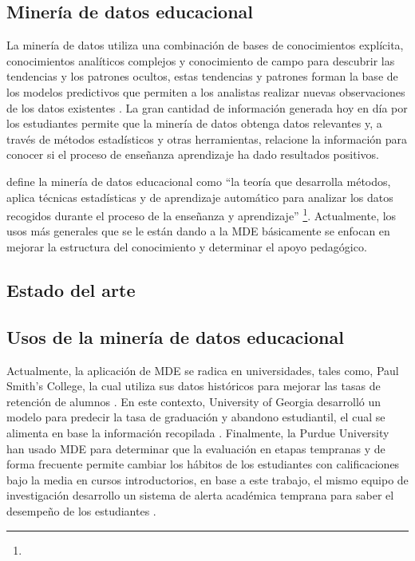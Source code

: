 \subsection*{Minería de datos educacional}
La minería de datos utiliza una combinación de bases de conocimientos explícita, conocimientos analíticos complejos y conocimiento de campo para descubrir las tendencias y los patrones ocultos, estas tendencias y patrones forman la base de los modelos predictivos que permiten a los analistas realizar nuevas observaciones de los datos existentes \parencite{luan2002data}. La gran cantidad de información generada hoy en día por los estudiantes permite que la minería de datos obtenga datos relevantes y, a través de métodos estadísticos y otras herramientas, relacione la información para conocer si el proceso de enseñanza aprendizaje ha dado resultados positivos. 

\textcite[p.~9]{mining2012enhancing} define la minería de datos educacional como “la teoría que desarrolla métodos, aplica técnicas estadísticas y de aprendizaje automático para analizar los datos recogidos durante el proceso de la enseñanza y aprendizaje” \footnote{\traduccionlibre}. Actualmente, los usos más generales que se le están dando a la MDE básicamente se enfocan en mejorar la estructura del conocimiento y determinar el apoyo pedagógico.

\subsection{Estado del arte}

\subsection*{Usos de la minería de datos educacional}


Actualmente, la aplicación de MDE se radica en universidades, tales como, Paul Smith’s College, la cual utiliza sus datos históricos para mejorar las tasas de retención de alumnos \parencite{bichsel2012analytics}. En este contexto, University of Georgia desarrolló un modelo para predecir la tasa de graduación y abandono estudiantil, el cual se alimenta en base la información recopilada \parencite{morris2005predicting}. Finalmente, la Purdue University han usado MDE para determinar que la evaluación en etapas tempranas y de forma frecuente permite cambiar los hábitos de los estudiantes con calificaciones bajo la media en cursos introductorios, en base a este trabajo, el mismo equipo de investigación desarrollo un sistema de alerta académica temprana para saber el desempeño de los estudiantes \parencite{baepler2010academic}. 

